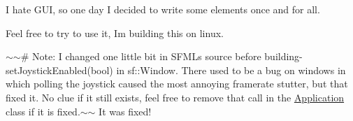 I hate G\+UI, so one day I decided to write some elements once and for all.

Feel free to try to use it, I\textquotesingle{}m building this on linux.

$\sim$$\sim$\# Note\+: I changed one little bit in S\+F\+ML\textquotesingle{}s source before building-\/ set\+Joystick\+Enabled(bool) in sf\+::\+Window. There used to be a bug on windows in which polling the joystick caused the most annoying framerate stutter, but that fixed it. No clue if it still exists, feel free to remove that call in the {\ttfamily \mbox{\hyperlink{class_application}{Application}}} class if it is fixed.$\sim$$\sim$ It was fixed! 